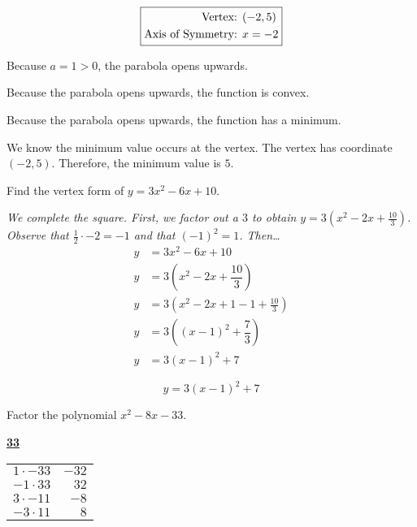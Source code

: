 \documentclass[12pt,letterpaper]{exam}
\begin{document}
\begin{questions}
\begin{enumerate}[(a)]
{	\[
	\boxed{%
	\begin{aligned}
	\text{Vertex: }& (-2, 5) \\
	\text{Axis of Symmetry: }& x= -2
	\end{aligned}
	}
	\] \pspace

\item Because $a= 1 > 0$, the parabola opens upwards. \pspace

\item Because the parabola opens upwards, the function is convex. \pspace

\item Because the parabola opens upwards, the function has a minimum. \pspace

\item We know the minimum value occurs at the vertex. The vertex has coordinate $(-2, 5)$. Therefore, the minimum value is $5$. 
}
\end{enumerate}





\newpage
\question[5] Find the vertex form of $y= 3x^2 - 6x + 10$. \pspace

{\noindent\itshape We complete the square. First, we factor out a $3$ to obtain $y= 3(x^2 - 2x + \frac{10}{3})$. Observe that $\frac{1}{2} \cdot -2= -1$ and that $(-1)^2= 1$. Then\dots
	\[
	\begin{aligned}
	y&= 3x^2 - 6x + 10 \\[0.3cm]
	y&= 3 \left( x^2 - 2x + \dfrac{10}{3} \right) \\[0.3cm]
	y&= 3 \left( x^2 - 2x + 1 - 1 + \frac{10}{3} \right) \\[0.3cm]
	y&= 3 \left( (x - 1)^2 + \dfrac{7}{3} \right) \\[0.3cm]
	y&= 3(x - 1)^2 + 7
	\end{aligned}
	\] \pspace
	
	\[
	\boxed{y= 3(x - 1)^2 + 7}
	\]
}





\newpage
\question[5] Factor the polynomial $x^2 - 8x - 33$. \pspace

	\begin{table}[!ht]
	\centering
	\underline{\bfseries 33} \pvspace{0.2cm}
	\begin{tabular}{rr}
	$1 \cdot -33$ & $-32$ \\
	$-1 \cdot 33$ & $32$ \\ \hline
	\multicolumn{1}{|r}{$3 \cdot -11$} & \multicolumn{1}{r|}{$-8$} \\ \hline
	$-3 \cdot 11$ & $8$ \\
	\end{tabular}
	\end{table}


\end{questions}
\end{document}
